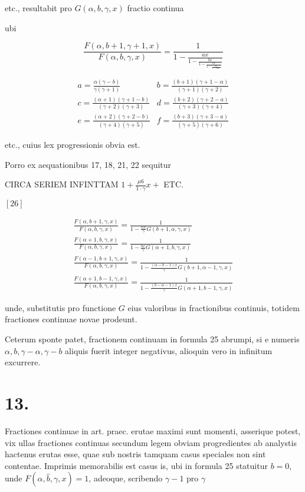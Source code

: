 \documentclass[10pt]{article}
\begin{document}
etc., resultabit pro \(G(\alpha, b, \gamma, x)\) fractio continua

ubi

\[
\frac{F(\alpha, b+1, \gamma+1, x)}{F(\alpha, b, \gamma, x)}=\frac{1}{1-\frac{a x}{1-\frac{b x}{1-\frac{c x}{1-\frac{d x}{1-\text { etc. }}}}}}
\]

\[
\begin{array}{ll}
a=\frac{\alpha(\gamma-b)}{\gamma(\gamma+1)} & b=\frac{(b+1)(\gamma+1-\alpha)}{(\gamma+1)(\gamma+2)} \\
c=\frac{(\alpha+1)(\gamma+1-b)}{(\gamma+2)(\gamma+3)} & d=\frac{(b+2)(\gamma+2-a)}{(\gamma+3)(\gamma+4)} \\
e=\frac{(\alpha+2)(\gamma+2-b)}{(\gamma+4)(\gamma+5)} & f=\frac{(b+3)(\gamma+3-a)}{(\gamma+5)(\gamma+6)}
\end{array}
\]

etc., cuius lex progressionis obvia est.

Porro ex aequationibus 17, 18, 21, 22 sequitur

CIRCA SERIEM INFINTTAM \(1+\frac{\mu 6}{1 \cdot \gamma} x+\) ETC.

\([26]\)

\[
\begin{gathered}
\frac{F(\alpha, b+1, \gamma, x)}{F(\alpha, b, \gamma, x)}=\frac{1}{1-\frac{\alpha x}{\gamma} G(b+1, \alpha, \gamma, x)} \\
\frac{F(\alpha+1, b, \gamma, x)}{F(\alpha, b, \gamma, x)}=\frac{1}{1-\frac{b x}{\gamma} G(\alpha+1, b, \gamma, x)} \\
\frac{F(\alpha-1, b+1, \gamma, x)}{F(\alpha, b, \gamma, x)}=\frac{1}{1-\frac{(\alpha-b-1) x}{\gamma} G(b+1, \alpha-1, \gamma, x)} \\
\frac{F(\alpha+1, b-1, \gamma, x)}{F(\alpha, b, \gamma, x)}=\frac{1}{1-\frac{(b-\alpha-1) x}{\gamma} G(\alpha+1, b-1, \gamma, x)}
\end{gathered}
\]

unde, substitutis pro functione \(G\) eius valoribus in fractionibus continuis, totidem fractiones continuae novae prodeunt.

Ceterum sponte patet, fractionem continuam in formula 25 abrumpi, si e numeris \(\alpha, b, \gamma-\alpha, \gamma-b\) aliquis fuerit integer negativus, alioquin vero in infinitum excurrere.

\section*{13.}
Fractiones continuae in art. praec. erutae maximi sunt momenti, asserique potest, vix ullas fractiones continuas secundum legem obviam progredientes ab analystis hactenus erutas esse, quae sub nostris tamquam casus speciales non sint contentae. Imprimis memorabilis est casus is, ubi in formula 25 statuitur \(b=0\), unde \(F(\alpha, \hat{b}, \gamma, x)=1\), adeoque, scribendo \(\gamma-1\) pro \(\gamma\)
\end{document}
